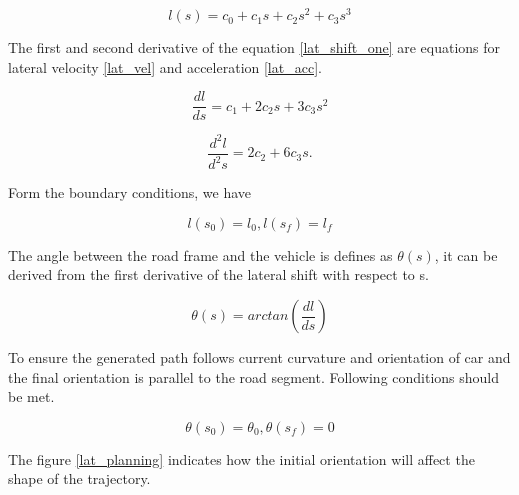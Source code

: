 \begin{equation}
l(s) = c_0 + c_1s + c_2s^2 + c_3s^3
\label{lat_shift_one}
\end{equation}

The first and second derivative of the equation \ref{lat_shift_one} are equations for lateral velocity \ref{lat_vel} and acceleration \ref{lat_acc}.

\begin{equation}
    \frac{dl}{ds} = c_1 + 2c_2s + 3c_3s^2
\label{lat_vel}
\end{equation}


\begin{equation}
    \frac{d^2l}{d^2s} = 2c_2 + 6c_3s.
\label{lat_acc}    
\end{equation}

Form the boundary conditions, we have

\begin{equation}
l(s_0) = l_0 , l(s_f ) = l_f
\label{lat_boudary}
\end{equation}

The angle between the road frame and the vehicle is defines as $\theta(s)$, it can be derived from the first derivative of the lateral shift with respect to s. 

\begin{equation}
\theta(s) = arctan(\frac{dl}{ds})
\label{lat_veh_theta}
\end{equation}

To ensure the generated path follows current curvature and orientation of car and the final orientation is parallel to the road segment. Following conditions should be met.


\begin{equation}
\theta(s_0) = \theta_0 , \theta(s_f) = 0
\label{th_bundary}
\end{equation}

The figure \ref{lat_planning} indicates how the initial orientation will affect the shape of the trajectory. 

